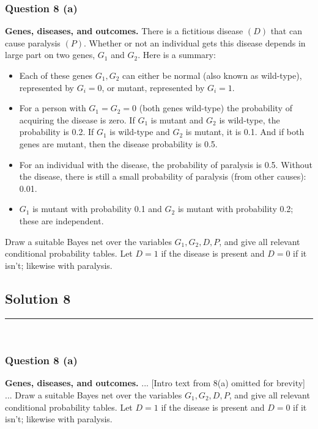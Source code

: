 \documentclass{article}
\begin{document}
\subsubsection*{Question 8 (a)}
\begin{flushleft}
    \textbf{Genes, diseases, and outcomes.} There is a fictitious disease $(D)$ that can cause paralysis $(P)$. 
    Whether or not an individual gets this disease depends in large part on two genes, $G_1$ and $G_2$. 
    Here is a summary: 

    \begin{itemize}
    \item Each of these genes $G_1, G_2$ can either be normal (also known as wild-type), represented by $G_i=0$, or mutant, represented by $G_i=1$. 
    \item For a person with $G_1=G_2=0$ (both genes wild-type) the probability of acquiring the disease is zero. 
    If $G_1$ is mutant and $G_2$ is wild-type, the probability is 0.2. 
    If $G_1$ is wild-type and $G_2$ is mutant, it is 0.1. 
    And if both genes are mutant, then the disease probability is 0.5. 
    \item For an individual with the disease, the probability of paralysis is 0.5. 
    Without the disease, there is still a small probability of paralysis (from other causes): 0.01. 
    \item $G_1$ is mutant with probability 0.1 and $G_2$ is mutant with probability 0.2; these are independent. 
    \end{itemize}

    Draw a suitable Bayes net over the variables $G_1, G_2, D, P$, and give all relevant conditional probability tables. 
    Let $D=1$ if the disease is present and $D=0$ if it isn't; likewise with paralysis. 
\end{flushleft}

\subsection*{Solution 8}
\noindent\rule{\textwidth}{0.4pt}\\
\subsubsection*{Question 8 (a)}
\begin{flushleft}
    \textbf{Genes, diseases, and outcomes.} ... [Intro text from 8(a) omitted for brevity] ...
    Draw a suitable Bayes net over the variables $G_1, G_2, D, P$, and give all relevant conditional probability tables. 
    Let $D=1$ if the disease is present and $D=0$ if it isn't; likewise with paralysis. 
\end{flushleft}
\end{document}
